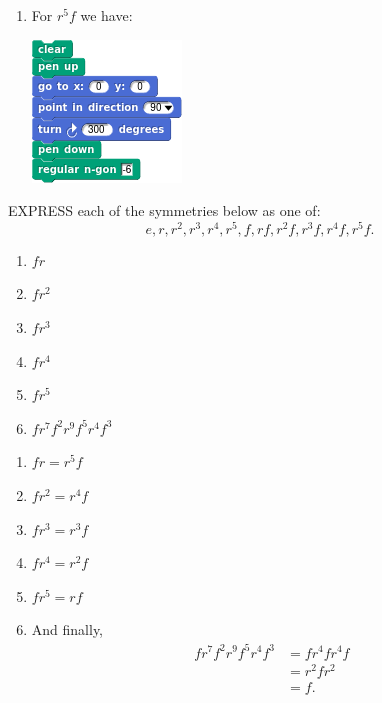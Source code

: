 \documentclass[noauthor,nooutcomes,hints,handout]{ximera}
\begin{document}
\begin{question}
\begin{freeResponse}
\begin{enumerate}
\begin{center}
      \end{center}
      \item For $r^5f$ we have:
      \begin{center}
        \includegraphics[width=.3\textwidth]{r5fHexSCRIPT.png}   \qquad {}
      \end{center}
    \end{enumerate}
    \end{freeResponse}
\end{question}
\mynewpage


\begin{question}
 EXPRESS each of the symmetries below as one of:
 \[
 e,r,r^2,r^3,r^4,r^5,f,rf,r^2f,r^3f, r^4f,r^5f.
 \]

 \begin{enumerate}
 \item $fr$
 \item $fr^2$
 \item $fr^3$
 \item $fr^4$
 \item $fr^5$
 \item $fr^7f^2r^9f^5r^4f^3$
 \end{enumerate}
 \begin{freeResponse}
   \begin{enumerate}
   \item $fr = r^5f$
   \item $fr^2 = r^4f$
   \item $fr^3 = r^3f$
   \item $fr^4 = r^2f$
   \item $fr^5 = rf$
   \item And finally,
     \begin{align*}
       fr^7f^2r^9f^5r^4f^3 &= fr^4fr^4f \\
       &= r^2f r^2\\
       &= f.
     \end{align*}
   \end{enumerate}
 \end{freeResponse}
\end{question}
\end{document}
